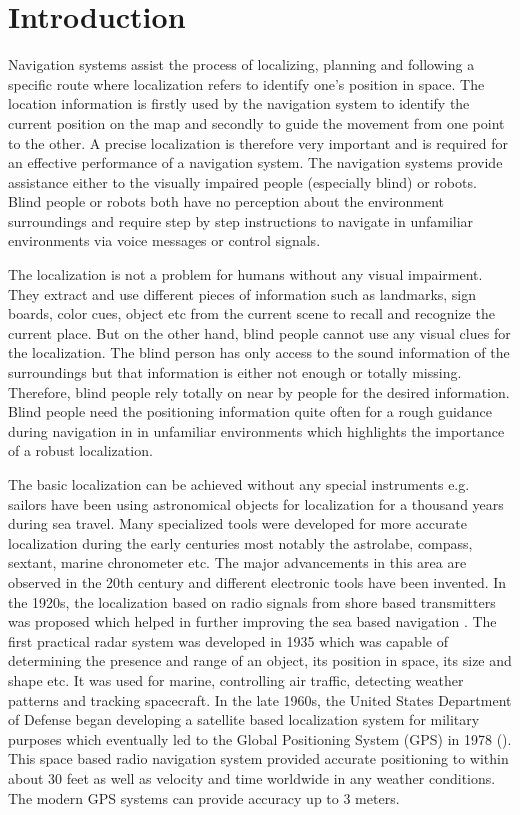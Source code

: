 \chapter{Introduction}
\label{chap:intro}

Navigation systems assist the
process of localizing, planning and following a specific route 
where localization refers to identify one's position in space.
The location information is firstly used by the navigation 
system to identify the current position on the map and 
secondly to guide the movement from one point to the other. 
A precise localization is therefore 
very important and is required for an effective 
performance of a navigation system.
The navigation systems provide
assistance either to the visually impaired people 
(especially blind) or robots. Blind people or 
robots both have no perception about the 
environment surroundings and require step by step instructions 
to navigate in unfamiliar environments via 
voice messages or control signals. 

The localization is not a problem for humans 
without any visual impairment. 
They extract and use different pieces of information 
such as landmarks, sign boards, color cues, object etc 
from the current scene to recall and recognize the current 
place. But on the other hand, blind people
cannot use any visual clues for the localization. 
The blind person has only access to the sound information 
of the surroundings but that information is either 
not enough or totally missing. Therefore, blind 
people rely totally on near by people for the 
desired information. Blind people need the 
positioning information quite often 
for a rough guidance during navigation in 
in unfamiliar environments which highlights 
the importance of a robust localization.


The basic localization can be achieved without any special instruments 
e.g. sailors have been using astronomical objects 
for localization for a thousand years during sea travel. 
Many specialized tools were
developed for more accurate localization 
during the early centuries 
most notably the astrolabe, compass, sextant, 
marine chronometer etc.
The major advancements in this area are 
observed in the 20th century and different 
electronic tools have been invented.
In the 1920s, the localization based on radio signals from 
shore based transmitters was proposed 
which helped in further improving the sea based navigation . 
The first practical radar system was developed in 1935 
which was capable of determining the 
presence and range of an object, its position in space,
its size and shape etc. It was used for marine, controlling air traffic, 
detecting weather patterns and tracking spacecraft.
In the late 1960s, the United States 
Department of Defense began developing a 
satellite based localization system for military purposes
which eventually led to the Global Positioning System (GPS) in 1978 (\cite{pace95}). 
This space based radio navigation system
provided accurate positioning to within about 30 feet 
as well as velocity and time worldwide in any weather conditions.
The modern GPS systems can provide accuracy up 
to 3 meters. 


